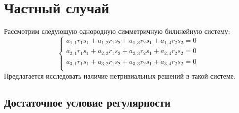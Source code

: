 \newpage
\section{Частный случай}
Рассмотрим следующую однородную симметричную билинейную систему: 
\begin{equation}\label{eq:trivial}
	\begin{cases}
		a_{1,1} r_1 s_1 + a_{1,2} r_1 s_2 + a_{1,3} r_2 s_1 + a_{1,4} r_2 s_2 = 0 \\
		a_{2,1} r_1 s_1 + a_{2,2} r_1 s_2 + a_{2,3} r_2 s_1 + a_{2,4} r_2 s_2 = 0 \\
		a_{3,1} r_1 s_1 + a_{3,2} r_1 s_2 + a_{3,3} r_2 s_1 + a_{3,4} r_2 s_2 = 0 \\
	\end{cases}
\end{equation}
Предлагается исследовать наличие нетривиальных решений в такой системе.

\subsection{Достаточное условие регулярности}

